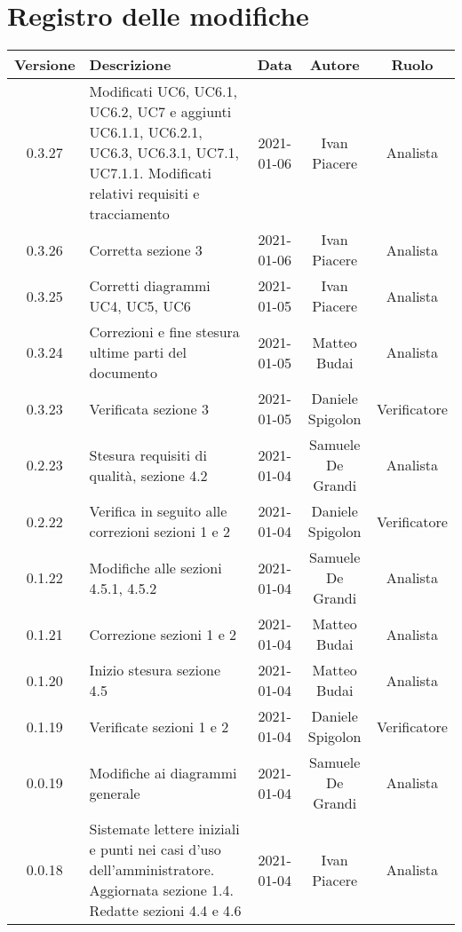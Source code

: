 \section*{Registro delle modifiche}

\begin{center}
	\begin{longtable}{|c|p{5cm}|c|c|c|}
		\hline
		\rowcolor{lighter-grayer}
		\textbf{Versione} & \textbf{Descrizione} & \textbf{Data} & \textbf{Autore} & \textbf{Ruolo} \\
		\hline
		\endfirsthead
		
		
		0.3.27 & Modificati UC6, UC6.1, UC6.2, UC7 e aggiunti UC6.1.1, UC6.2.1, UC6.3, UC6.3.1, UC7.1, UC7.1.1. Modificati relativi requisiti e tracciamento & 2021-01-06 & Ivan Piacere & Analista \\
		\hline
		0.3.26 & Corretta sezione 3 & 2021-01-06 & Ivan Piacere & Analista \\
		\hline
		0.3.25 & Corretti diagrammi UC4, UC5, UC6 & 2021-01-05 & Ivan Piacere & Analista \\
		\hline
		0.3.24 & Correzioni e fine stesura ultime parti del documento & 2021-01-05 & Matteo Budai & Analista \\
		\hline
		0.3.23 & Verificata sezione 3 & 2021-01-05 & Daniele Spigolon & Verificatore \\
		\hline
		0.2.23 & Stesura requisiti di qualità, sezione 4.2  & 2021-01-04 & Samuele De Grandi & Analista \\
		\hline
		0.2.22 & Verifica in seguito alle correzioni sezioni 1 e 2   & 2021-01-04 & Daniele Spigolon & Verificatore \\
		\hline
		0.1.22 & Modifiche alle sezioni 4.5.1, 4.5.2   & 2021-01-04 & Samuele De Grandi & Analista \\
		\hline
		0.1.21 & Correzione sezioni 1 e 2 & 2021-01-04 & Matteo Budai & Analista \\
		\hline
		0.1.20 & Inizio stesura sezione 4.5 & 2021-01-04 & Matteo Budai & Analista \\
		\hline
		0.1.19 & Verificate sezioni 1 e 2 & 2021-01-04 & Daniele Spigolon & Verificatore \\
		\hline
		0.0.19 & Modifiche ai diagrammi generale  & 2021-01-04 & Samuele De Grandi & Analista \\
		\hline
		0.0.18 & Sistemate lettere iniziali e punti nei casi d'uso dell'amministratore. Aggiornata sezione 1.4. Redatte sezioni 4.4 e 4.6 & 2021-01-04 & Ivan Piacere & Analista \\

\end{longtable}
\end{center}
